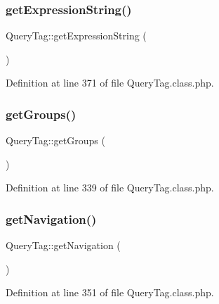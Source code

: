 \mbox{\label{classQueryTag_a93b4b4a6a4362f1792f72683983ab8d6}} 
\subsubsection{\texorpdfstring{get\+Expression\+String()}{getExpressionString()}}
{\footnotesize\ttfamily Query\+Tag\+::get\+Expression\+String (\begin{DoxyParamCaption}{ }\end{DoxyParamCaption})}



Definition at line 371 of file Query\+Tag.\+class.\+php.

\mbox{\label{classQueryTag_a1401e1676925bf78bcbbdb6ed5ad7bf0}} 
\subsubsection{\texorpdfstring{get\+Groups()}{getGroups()}}
{\footnotesize\ttfamily Query\+Tag\+::get\+Groups (\begin{DoxyParamCaption}{ }\end{DoxyParamCaption})}



Definition at line 339 of file Query\+Tag.\+class.\+php.

\mbox{\label{classQueryTag_a5e2bfd8ddd3fc2d64efe6da1af0da8f8}} 
\subsubsection{\texorpdfstring{get\+Navigation()}{getNavigation()}}
{\footnotesize\ttfamily Query\+Tag\+::get\+Navigation (\begin{DoxyParamCaption}{ }\end{DoxyParamCaption})}



Definition at line 351 of file Query\+Tag.\+class.\+php.

\mbox{\label{classQueryTag_ab87ed2df775139a76a47f8d12daff6ba}} 
